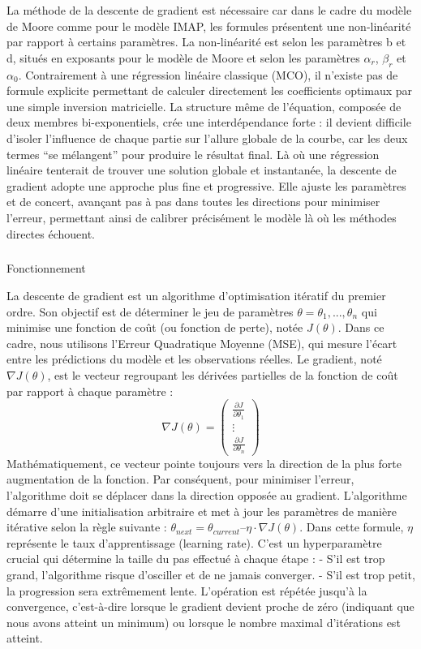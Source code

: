 \documentclass[
  french,
  11pt,
  a4paper,
]{article}
\makeatletter
\let\oldsubparagraph\subparagraph
\renewcommand{\subparagraph}{
    \@ifstar
      \xxxSubParagraphStar
      \xxxSubParagraphNoStar
  }
\newcommand{\xxxSubParagraphStar}[1]{\oldsubparagraph*{#1}\mbox{}}
\newcommand{\xxxSubParagraphNoStar}[1]{\oldsubparagraph{#1}\mbox{}}
\makeatother
\begin{document}
La méthode de la descente de gradient est nécessaire car dans le cadre
du modèle de Moore comme pour le modèle IMAP, les formules présentent
une non-linéarité par rapport à certains paramètres. La non-linéarité
est selon les paramètres b et d, situés en exposants pour le modèle de
Moore et selon les paramètres \(\alpha_r\), \(\beta_r\) et \(\alpha_0\).
Contrairement à une régression linéaire classique (MCO), il n'existe pas
de formule explicite permettant de calculer directement les coefficients
optimaux par une simple inversion matricielle. La structure même de
l'équation, composée de deux membres bi-exponentiels, crée une
interdépendance forte : il devient difficile d'isoler l'influence de
chaque partie sur l'allure globale de la courbe, car les deux termes
``se mélangent'' pour produire le résultat final. Là où une régression
linéaire tenterait de trouver une solution globale et instantanée, la
descente de gradient adopte une approche plus fine et progressive. Elle
ajuste les paramètres et de concert, avançant pas à pas dans toutes les
directions pour minimiser l'erreur, permettant ainsi de calibrer
précisément le modèle là où les méthodes directes échouent.

\subparagraph{Fonctionnement}\label{fonctionnement}

La descente de gradient est un algorithme d'optimisation itératif du
premier ordre. Son objectif est de déterminer le jeu de paramètres
\(\theta={\theta_1, ...,\theta_n}\) qui minimise une fonction de coût
(ou fonction de perte), notée \(J(\theta)\). Dans ce cadre, nous
utilisons l'Erreur Quadratique Moyenne (MSE), qui mesure l'écart entre
les prédictions du modèle et les observations réelles. Le gradient, noté
\(\nabla J(\theta)\), est le vecteur regroupant les dérivées partielles
de la fonction de coût par rapport à chaque paramètre :
\[\nabla J(\theta) = \begin{pmatrix} \frac{\partial J}{\partial \theta_1} \\ \vdots \\ \frac{\partial J}{\partial \theta_n} \end{pmatrix}\]
Mathématiquement, ce vecteur pointe toujours vers la direction de la
plus forte augmentation de la fonction. Par conséquent, pour minimiser
l'erreur, l'algorithme doit se déplacer dans la direction opposée au
gradient. L'algorithme démarre d'une initialisation arbitraire et met à
jour les paramètres de manière itérative selon la règle suivante :
\(\theta_{next} = \theta_{current} – \eta \cdot \nabla J(\theta)\). Dans
cette formule, \(\eta\) représente le taux d'apprentissage (learning
rate). C'est un hyperparamètre crucial qui détermine la taille du pas
effectué à chaque étape : - S'il est trop grand, l'algorithme risque
d'osciller et de ne jamais converger. - S'il est trop petit, la
progression sera extrêmement lente. L'opération est répétée jusqu'à la
convergence, c'est-à-dire lorsque le gradient devient proche de zéro
(indiquant que nous avons atteint un minimum) ou lorsque le nombre
maximal d'itérations est atteint.
\end{document}
